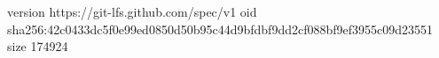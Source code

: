 version https://git-lfs.github.com/spec/v1
oid sha256:42c0433dc5f0e99ed0850d50b95c44d9bfdbf9dd2cf088bf9ef3955c09d23551
size 174924
